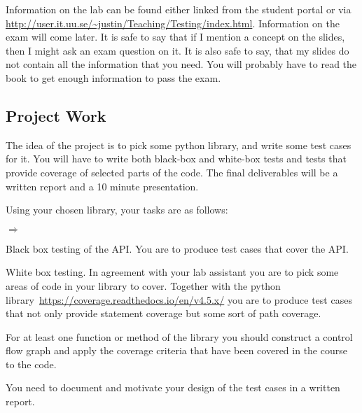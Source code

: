 \documentclass[a4paper]{article}
\begin{document}
  Information on the lab can be found either linked from the student
  portal or via
  \url{http://user.it.uu.se/~justin/Teaching/Testing/index.html}. Information
  on the exam will come later. It is safe to say that if I mention a
  concept on the slides, then I might ask an exam question on it. It
  is also safe to say, that my slides do not contain all the
  information that you need. You will probably have to read the book
  to get enough information to pass the exam.

\subsection*{Project Work}

The idea of the project is to pick some python library, and write some
test cases for it. You will have to write both black-box and white-box
tests and tests that provide coverage of selected parts of the
code. The final deliverables will be a written report and a 10 minute
presentation.


Using your chosen library, your tasks are as follows:
\begin{list}{$\Rightarrow$}{} 
    \item  Black box testing of the API. You are to produce test cases
      that cover the API.
    \item  White box testing. In agreement with your lab assistant you
      are to pick some areas of code in your library to cover. Together with
      the python library~\url{https://coverage.readthedocs.io/en/v4.5.x/} you are
      to produce test cases that not only provide statement coverage
      but some sort of path coverage. 
    \item For at least one function or method of the library you
      should construct a control flow graph and apply the coverage criteria
      that have been covered in the course to the code.
    \item You need to document and motivate your design of the test cases in
      a written report. 
\end{list}
\end{document}
